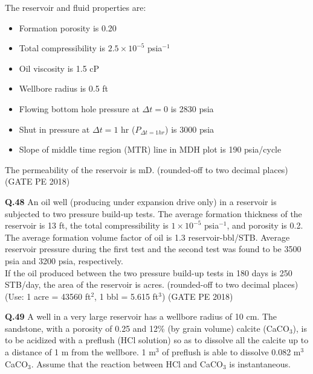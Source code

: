 \documentclass[12pt,a4paper]{article}
\begin{document}
The reservoir and fluid properties are: 
\begin{itemize}
  \item Formation porosity is 0.20
  \item Total compressibility is $2.5 \times 10^{-5}$ psia$^{-1}$
  \item Oil viscosity is 1.5 cP
  \item Wellbore radius is 0.5 ft
  \item Flowing bottom hole pressure at $\Delta t = 0$ is 2830 psia
  \item Shut in pressure at $\Delta t = 1$ hr ($P_{\Delta t=1hr}$) is 3000 psia
  \item Slope of middle time region (MTR) line in MDH plot is 190 psia/cycle
\end{itemize}

The permeability of the reservoir is \underline{\hspace{2cm}} mD. (rounded-off to two decimal places) \hfill (GATE PE 2018)

\vspace{1cm}

\noindent\textbf{Q.48} An oil well (producing under expansion drive only) in a reservoir is subjected to two pressure build-up tests. The average formation thickness of the reservoir is 13 ft, the total compressibility is $1\times10^{-5}$ psia$^{-1}$, and porosity is 0.2. The average formation volume factor of oil is 1.3 reservoir-bbl/STB. Average reservoir pressure during the first test and the second test was found to be 3500 psia and 3200 psia, respectively. \\ 
If the oil produced between the two pressure build-up tests in 180 days is 250 STB/day, the area of the reservoir is \underline{\hspace{2cm}} acres. (rounded-off to two decimal places) \\ 
(Use: 1 acre = 43560 ft$^2$, 1 bbl = 5.615 ft$^3$) \hfill (GATE PE 2018)

\vspace{1cm}

\noindent\textbf{Q.49} A well in a very large reservoir has a wellbore radius of 10 cm. The sandstone, with a porosity of 0.25 and 12\% (by grain volume) calcite (CaCO$_3$), is to be acidized with a preflush (HCl solution) so as to dissolve all the calcite up to a distance of 1 m from the wellbore. 1 m$^3$ of preflush is able to dissolve 0.082 m$^3$ CaCO$_3$. Assume that the reaction between HCl and CaCO$_3$ is instantaneous. 
\end{document}
